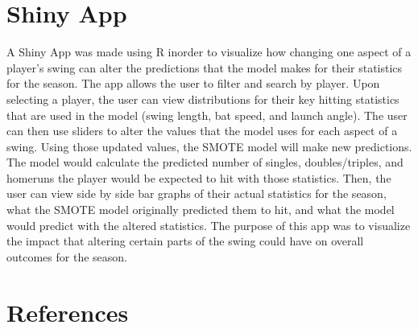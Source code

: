\documentclass[
  letterpaper,
  DIV=11,
  numbers=noendperiod]{scrartcl}
\begin{document}
\section{Shiny App}\label{shiny-app}

A Shiny App was made using R inorder to visualize how changing one
aspect of a player's swing can alter the predictions that the model
makes for their statistics for the season. The app allows the user to
filter and search by player. Upon selecting a player, the user can view
distributions for their key hitting statistics that are used in the
model (swing length, bat speed, and launch angle). The user can then use
sliders to alter the values that the model uses for each aspect of a
swing. Using those updated values, the SMOTE model will make new
predictions. The model would calculate the predicted number of singles,
doubles/triples, and homeruns the player would be expected to hit with
those statistics. Then, the user can view side by side bar graphs of
their actual statistics for the season, what the SMOTE model originally
predicted them to hit, and what the model would predict with the altered
statistics. The purpose of this app was to visualize the impact that
altering certain parts of the swing could have on overall outcomes for
the season.

\newpage

\section*{References}\label{references}
\end{document}
